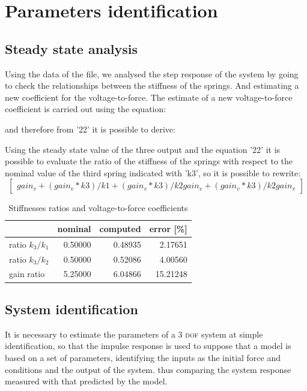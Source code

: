 \chapter{Parameters identification}
\label{chap:paramidentification}
\section{Steady state analysis}
\label{sec:steadystate}
Using the data of the file, we analysed the step response of the system by going
to check the relationships between the stiffness of the springs. 
And estimating a new coefficient for the voltage-to-force.
The estimate of a new voltage-to-force coefficient is carried out using the 
equation:

and therefore from '22' it is possible to derive:

Using the steady state value of the three output and the equation '22' it is 
possible to evaluate the ratio of the stiffness of the springs with respect to 
the nominal value of the third spring indicated with 'k3', so it is possible to
rewrite:
\begin{equation}
	\label{eq:gvestimate}
	\begin{bmatrix}
		gain_v + (gain_v*k3)/k1 + (gain_v*k3)/k2
    		gain_v + (gain_v*k3)/k2
    		gain_v
    \end{bmatrix}
\end{equation}


\begin{table}[ht]
\centering
	\begin{tabular}{lrrr}
	\toprule
						& nominal & computed & error [\%] \\
 	\midrule
 	ratio $k_{3}/k_{1}$	& 0.50000 & 0.48935 &	2.17651 \\
	ratio $k_{3}/k_{2}$	& 0.50000 & 0.52086 & 	4.00560 \\
	gain ratio			& 5.25000 & 6.04866 &  15.21248	\\
	\bottomrule
	\end{tabular}
\caption{Stiffnesses ratios and voltage-to-force coefficients}
\label{tab:erro}
\end{table}
%
%
\section{System identification}
\label{sec:sysidentification}
It is necessary to estimate the parameters of a 3 \textsc{dof} system at simple 
identification, so that the impulse response is used to suppose that a model is 
based on a set of parameters, identifying the inputs as the initial force and 
conditions and the output of the system.
thus comparing the system response measured with that predicted by the model.


